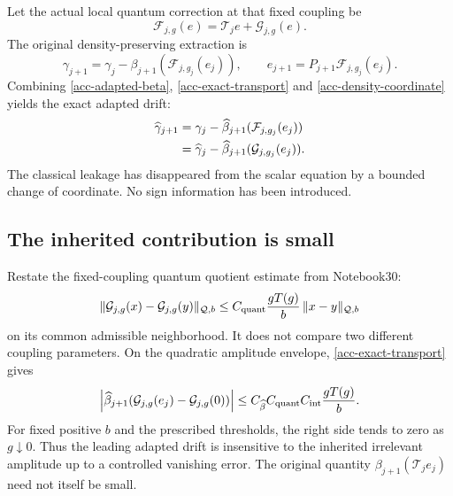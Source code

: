 Let the actual local quantum correction at that fixed
coupling be
\begin{equation}
             \mathcal F_{j,g}(e)
                   =\mathcal T_je+\mathcal G_{j,g}(e).
 \label{acc-quantum-decomposition}
\end{equation}
The original density-preserving extraction is
\begin{equation}
 \gamma_{j+1}
   =\gamma_j-\beta_{j+1}(\mathcal F_{j,g_j}(e_j)),\qquad
 e_{j+1}=P_{j+1}\mathcal F_{j,g_j}(e_j).
 \label{acc-original-update}
\end{equation}
Combining \eqref{acc-adapted-beta},
\eqref{acc-exact-transport} and
\eqref{acc-density-coordinate} yields the exact adapted drift:
\begin{align}
 \widehat\gamma_{j+1}
 &=\gamma_j-\widehat\beta_{j+1}
                           (\mathcal F_{j,g_j}(e_j))\notag\\
 &=\widehat\gamma_j-
                         \widehat\beta_{j+1}
                           (\mathcal G_{j,g_j}(e_j)).
 \label{acc-adapted-update}
\end{align}
The classical leakage has disappeared from the scalar
equation by a bounded change of coordinate. No sign
information has been introduced.

\subsection{The inherited contribution is small}
\label{acc-inherited-section}

Restate the fixed-coupling quantum quotient estimate from
Notebook30:
\begin{equation}
 \|\mathcal G_{j,g}(x)-\mathcal G_{j,g}(y)\|_{\mathcal Q,b}
 \le C_{\rm quant}\frac{gT(g)}b\,
                         \|x-y\|_{\mathcal Q,b}
 \label{acc-quantum-input-bound}
\end{equation}
on its common admissible neighborhood. It does not compare
two different coupling parameters. On the quadratic
amplitude envelope, \eqref{acc-exact-transport} gives
\begin{equation}
 \left|\widehat\beta_{j+1}
       (\mathcal G_{j,g}(e_j)-\mathcal G_{j,g}(0))\right|
 \le C_{\widehat\beta}C_{\rm quant}C_{\rm int}
                                      \frac{gT(g)}b.
 \label{acc-inherited-drift}
\end{equation}
For fixed positive $b$ and the prescribed thresholds,
the right side tends to zero as $g\downarrow0$.
Thus the leading adapted drift is insensitive to the
inherited irrelevant amplitude up to a controlled
vanishing error. The original quantity
$\beta_{j+1}(\mathcal T_je_j)$ need not itself be small.

